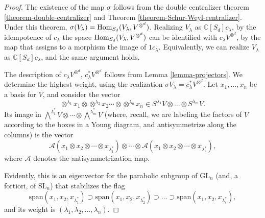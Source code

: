 \begin{proof}
 The existence of the map $\sigma$ follows from the double centralizer theorem \ref{theorem-double-centralizer} and Theorem \ref{theorem-Schur-Weyl-centralizer}. Under this theorem, $\sigma(V_\lambda) = \mathop{\rm Hom}\nolimits_{S_d} (V_\lambda, V^{\otimes^d})$. Realizing $V_\lambda$ as $\mathbb C[S_d]c_\lambda$, by the idempotence of $c_\lambda$ the space $\mathop{\rm Hom}\nolimits_{S_d} (V_\lambda, V^{\otimes^d})$ can be identified with $c_\lambda V^{\otimes^d}$, by the map that assigns to a morphism the image of $1c_\lambda$. Equivalently, we can realize $V_\lambda$ as $\mathbb C[S_d]c_\lambda$, and the same argument holds. 
 
 The description of $c_\lambda V^{\otimes^d}$, $c_\lambda^* V^{\otimes^d}$ follows from Lemma \ref{lemma-projectors}. We determine the highest weight, using the realization $\sigma V_\lambda = c_\lambda^* V^{\otimes^d}$. Let $x_1, \dots, x_n$ be a basis for $V$, and consider the vector
 $$ \otimes^{\lambda_1} x_1 \otimes \otimes^{\lambda_2} x_2 \cdots \otimes \otimes^{\lambda_n} x_n \in S^{\lambda_1} V \otimes \dots \otimes S^{\lambda_m} V.$$
 Its image in $\bigwedge^{\lambda_1^*}V \otimes \cdots \otimes \bigwedge^{\lambda_m^*} V$ (where, recall, we are labeling the factors of $V$ according to the boxes in a Young diagram, and antisymmetrize along the columns) is the vector 
 $$ \mathcal A(x_1\otimes x_2 \otimes\cdots\otimes x_{\lambda^*_1}) \otimes \cdots \otimes \mathcal A(x_1\otimes x_2 \otimes\cdots\otimes x_{\lambda^*_r}),$$
 where $\mathcal A$ denotes the antisymmetrization map. 
 
 Evidently, this is an eigenvector for the parabolic subgroup of $\text{GL}_n$ (and, a fortiori, of $\text{SL}_n$) that stabilizes the flag 
 $$ \text{span}(x_1,x_2, x_{\lambda^*_1}) \supset \text{span}(x_1,x_2, x_{\lambda^*_2}) \supset \dots \supset \text{span}(x_1,x_2, x_{\lambda^*_r}),$$
 and its weight is $(\lambda_1, \lambda_2 ,\dots, \lambda_n)$. 
 
 
\end{proof}











